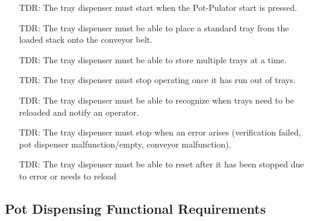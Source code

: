 \documentclass[12pt]{article}
\newcounter{tdreqnum} %
\newcounter{reqnum} %
\begin{document}
  \noindent \begin{itemize}
  
  \item[TDR\refstepcounter{tdreqnum}\thetdreqnum \label{R_Tray0}:] {The tray dispenser must
      start when the Pot-Pulator start is pressed.}
  
  \item[TDR\refstepcounter{tdreqnum}\thetdreqnum \label{R_Tray1}:] {The tray dispenser must
      be able to place a standard tray from the loaded stack onto the conveyor belt.}
  
  \item[TDR\refstepcounter{tdreqnum}\thetdreqnum \label{R_Tray2}:] {The tray dispenser must
        be able to store multiple trays at a time.}
  
  \item[TDR\refstepcounter{tdreqnum}\thetdreqnum \label{R_Tray5}:] {The tray dispenser must
      stop operating once it has run out of trays.}
  
  \item[TDR\refstepcounter{tdreqnum}\thetdreqnum \label{R_Tray6}:] {The tray dispenser must
      be able to recognize when trays need to be reloaded and notify an operator.}
  
  \item[TDR\refstepcounter{tdreqnum}\thetdreqnum \label{R_Tray7}:] {The tray dispenser must
       stop when an error arises (verification failed, pot dispenser malfunction/empty, conveyor
       malfunction).}
  
  \item[TDR\refstepcounter{tdreqnum}\thetdreqnum \label{R_Tray8}:] {The tray dispenser must
      be able to reset after it has been stopped due to error or needs to reload}
  
  
  \end{itemize}
  
  \subsection{Pot Dispensing Functional Requirements}
  
\end{document}

